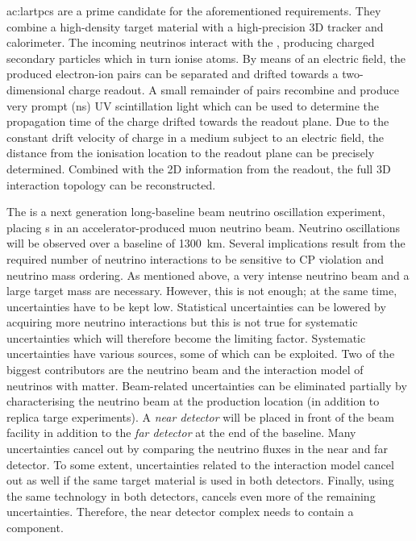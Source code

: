 \glspl{ac:lartpc} are a prime candidate for the aforementioned requirements.
They combine a high-density target material with a high-precision 3D tracker and calorimeter.
The incoming neutrinos interact with the \lar{}, producing charged secondary particles which in turn ionise  atoms.
By means of an electric field, the produced electron-ion pairs can be separated and drifted towards a two-dimensional charge readout.
A small remainder of pairs recombine and produce very prompt (\si{\nano\second}) UV scintillation light which can be used to determine the propagation time of the charge drifted towards the readout plane.
Due to the constant drift velocity of charge in a medium subject to an electric field, the distance from the ionisation location to the readout plane can be precisely determined.
Combined with the 2D information from the readout, the full 3D interaction topology can be reconstructed.

The \dune{} is a next generation long-baseline beam neutrino oscillation experiment, placing \lartpc{}s in an accelerator-produced muon neutrino beam.
Neutrino oscillations will be observed over a baseline of \SI{1300}{\kilo\metre}.
Several implications result from the required number of neutrino interactions to be sensitive to CP violation and neutrino mass ordering.
As mentioned above, a very intense neutrino beam and a large target mass are necessary.
However, this is not enough; at the same time, uncertainties have to be kept low.
Statistical uncertainties can be lowered by acquiring more neutrino interactions but this is not true for systematic uncertainties which will therefore become the limiting factor.
Systematic uncertainties have various sources, some of which can be exploited.
Two of the biggest contributors are the neutrino beam and the interaction model of neutrinos with matter.
Beam-related uncertainties can be eliminated partially by characterising the neutrino beam at the production location (in addition to replica targe experiments).
A \emph{near detector} will be placed in front of the beam facility in addition to the \emph{far detector} at the end of the baseline.
Many uncertainties cancel out by comparing the neutrino fluxes in the near and far detector.
To some extent, uncertainties related to the interaction model cancel out as well if the same target material is used in both detectors.
Finally, using the same technology in both detectors, cancels even more of the remaining uncertainties.
Therefore, the near detector complex needs to contain a \lartpc{} component.

